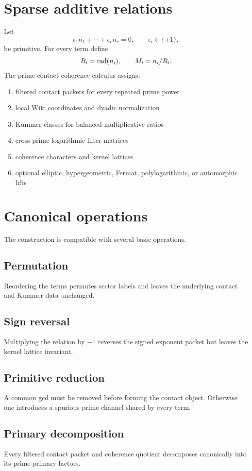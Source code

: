 \section{Sparse additive relations}
Let
\[
 \epsilon_1n_1+\cdots+\epsilon_rn_r=0,
 \qquad
 \epsilon_i\in\{\pm1\},
\]
be primitive. For every term define
\[
 R_i=\operatorname{rad}(n_i),
 \qquad
 M_i=n_i/R_i.
\]
The prime-contact coherence calculus assigns:

\begin{enumerate}[leftmargin=1.5em]
\item filtered contact packets for every repeated prime power
\item local Witt coordinates and dyadic normalization
\item Kummer classes for balanced multiplicative ratios
\item cross-prime logarithmic filter matrices
\item coherence characters and kernel lattices
\item optional elliptic, hypergeometric, Fermat, polylogarithmic, or automorphic lifts
\end{enumerate}

\section{Canonical operations}
The construction is compatible with several basic operations.

\subsection{Permutation}
Reordering the terms permutes sector labels and leaves the underlying contact and Kummer data unchanged.

\subsection{Sign reversal}
Multiplying the relation by $-1$ reverses the signed exponent packet but leaves the kernel lattice invariant.

\subsection{Primitive reduction}
A common gcd must be removed before forming the contact object. Otherwise one introduces a spurious prime channel shared by every term.

\subsection{Primary decomposition}
Every filtered contact packet and coherence quotient decomposes canonically into its prime-primary factors.

